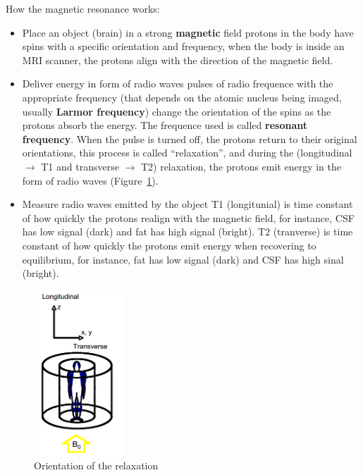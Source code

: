 \documentclass[12pt,article,oneside,a4paper]{memoir}
\begin{document}
How the magnetic resonance works:
\begin{itemize}
\item Place an object (brain) in a strong \textbf{magnetic} field
\subitem protons in the body have spins with a specific orientation and
frequency, when the body is inside an MRI scanner, the protons align with the
direction of the magnetic field.
\item Deliver energy in form of radio waves
\subitem pulses of radio frequence with the appropriate frequency (that depends
on the atomic nucleus being imaged, usually \textbf{Larmor frequency}) change
the orientation of the spins as the protons absorb the energy. The frequence
used is called \textbf{resonant frequency}. When the pulse is turned off, the
protons return to their original orientations, this process is called
``relaxation'', and during the (longitudinal $\rightarrow$ T1 and transverse
$\rightarrow$ T2) relaxation, the protons emit energy in the form of radio
waves (Figure~\ref{fig:orientation-relaxation}).
\item Measure radio waves emitted by the object
\subitem T1 (longitunial) is time constant of how quickly the protons realign
with the magnetic field, for instance, CSF has low signal (dark) and fat has
high signal (bright).
\subitem T2 (tranverse) is time constant of how quickly the protons emit
energy when recovering to equilibrium, for instance, fat has low signal (dark)
and CSF has high sinal (bright).
\end{itemize}

\begin{figure}
  \centering
  \includegraphics[width=0.3\textwidth]{imgs/mri-longitudinal-transverse.png}
  \caption{Orientation of the relaxation}
  \label{fig:orientation-relaxation}
\end{figure}
\end{document}
